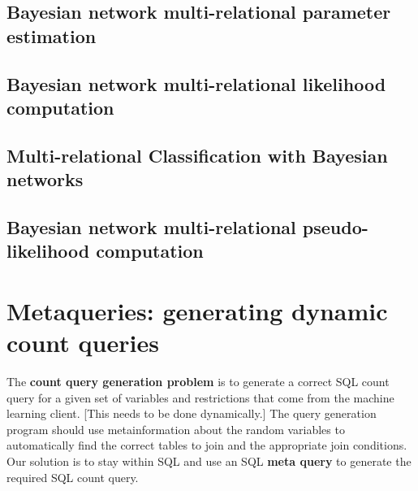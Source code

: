 \documentclass{acm_proc_article-sp}
\begin{document}
\subsection{Bayesian network multi-relational parameter estimation}

\subsection{Bayesian network multi-relational likelihood computation}

\subsection{Multi-relational Classification with Bayesian networks}

\subsection{Bayesian network multi-relational pseudo-likelihood computation}

\section{Metaqueries: generating dynamic count queries}

The \textbf{count query generation problem} is to generate a correct SQL count query for a given set of variables and restrictions that come from the machine learning client. [This needs to be done dynamically.] The query generation program should use metainformation about the random variables to automatically find the correct tables to join and the appropriate join conditions. Our solution is to stay within SQL and use an SQL \textbf{meta query} to generate the required SQL count query. 
\end{document}
